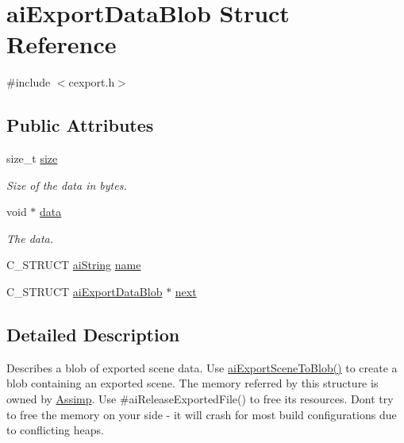 \hypertarget{structai_export_data_blob}{}\section{ai\+Export\+Data\+Blob Struct Reference}
\label{structai_export_data_blob}


{\ttfamily \#include $<$cexport.\+h$>$}

\subsection*{Public Attributes}
\begin{DoxyCompactItemize}
\item 
size\+\_\+t \hyperlink{structai_export_data_blob_a339bfaacc70396b2f99f94c1bc3b808f}{size}\hypertarget{structai_export_data_blob_a339bfaacc70396b2f99f94c1bc3b808f}{}\label{structai_export_data_blob_a339bfaacc70396b2f99f94c1bc3b808f}

\begin{DoxyCompactList}\small\item\em Size of the data in bytes. \end{DoxyCompactList}\item 
void $\ast$ \hyperlink{structai_export_data_blob_ac080c780dad92077b42447d77a1a9ed1}{data}\hypertarget{structai_export_data_blob_ac080c780dad92077b42447d77a1a9ed1}{}\label{structai_export_data_blob_ac080c780dad92077b42447d77a1a9ed1}

\begin{DoxyCompactList}\small\item\em The data. \end{DoxyCompactList}\item 
C\+\_\+\+S\+T\+R\+U\+CT \hyperlink{structai_string}{ai\+String} \hyperlink{structai_export_data_blob_af7f006ac5ad818c0d81d520a84f74c3e}{name}
\item 
C\+\_\+\+S\+T\+R\+U\+CT \hyperlink{structai_export_data_blob}{ai\+Export\+Data\+Blob} $\ast$ \hyperlink{structai_export_data_blob_a3e98fa760f45983ff1bccec6715f3817}{next}
\end{DoxyCompactItemize}


\subsection{Detailed Description}
Describes a blob of exported scene data. Use \hyperlink{cexport_8h_a33b02f2dbfd79980bf29e62f3a64139f}{ai\+Export\+Scene\+To\+Blob()} to create a blob containing an exported scene. The memory referred by this structure is owned by \hyperlink{namespace_assimp}{Assimp}. Use \#ai\+Release\+Exported\+File() to free its resources. Don\textquotesingle{}t try to free the memory on your side -\/ it will crash for most build configurations due to conflicting heaps.

